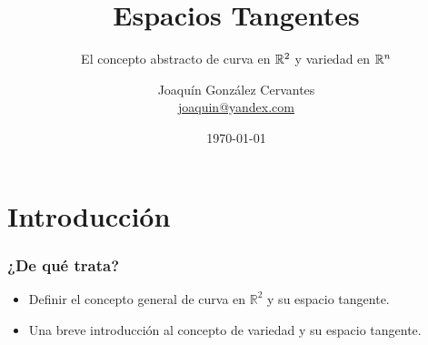 \documentclass{beamer}
\title[Espacios Tangentes]{
    Espacios Tangentes}
\subtitle{El concepto abstracto de curva en $\realR^{2}$ y variedad en $\realR^{n}$}
\author[Joaquín González Cervantes]{
  Joaquín González Cervantes \\\medskip
  {\small \url{joaquin@yandex.com}}}
\institute[Universidad de Guadalajara]{}
\date[\today]{
   \today}
\def\realR{\mathbb{R}} %
\begin{document}
\begin{frame}
  \titlepage
\end{frame}

\section{Introducción}

\begin{frame}
\frametitle{¿De qué trata?}
  \begin{block}{}
    \begin{itemize}
        \item Definir el concepto general de curva en $\realR^{2}$ y su espacio tangente.
        \item Una breve introducción al concepto de variedad y su espacio tangente.
    \end{itemize}
  \end{block}
\end{frame}
\end{document}
